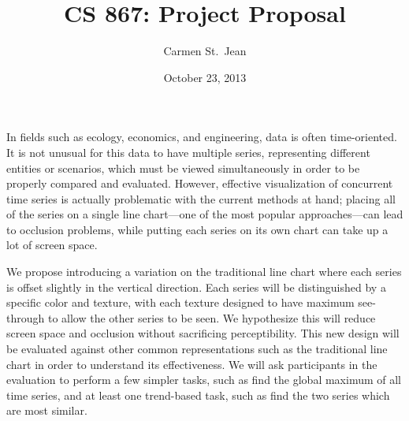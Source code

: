 \documentclass{article} %
\begin{document}
\title{CS 867: Project Proposal}
\date{October 23, 2013}
\author{Carmen St.\ Jean}

\maketitle

\vspace{5 mm}

In fields such as ecology, economics, and engineering, data is often time-oriented.  It is not unusual for this data to have multiple series, representing different entities or scenarios, which must be viewed simultaneously in order to be properly compared and evaluated.  However, effective visualization of concurrent time series is actually problematic with the current methods at hand; placing all of the series on a single line chart---one of the most popular approaches---can lead to occlusion problems, while putting each series on its own chart can take up a lot of screen space.

We propose introducing a variation on the traditional line chart where each series is offset slightly in the vertical direction.  Each series will be distinguished by a specific color and texture, with each texture designed to have maximum see-through to allow the other series to be seen.  We hypothesize this will reduce screen space and occlusion without sacrificing perceptibility.  This new design will be evaluated against other common representations such as the traditional line chart in order to understand its effectiveness.  We will ask participants in the evaluation to perform a few simpler tasks, such as find the global maximum of all time series, and at least one trend-based task, such as find the two series which are most similar.
\end{document}
